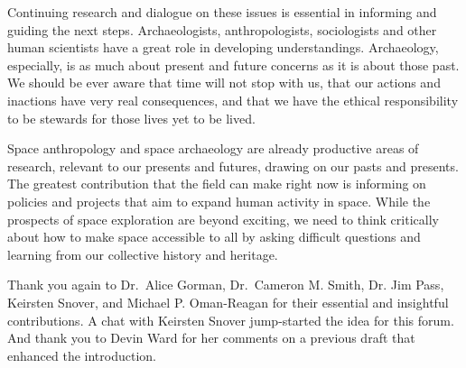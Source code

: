 Continuing research and dialogue on these issues is essential in informing and guiding the next steps. Archaeologists, anthropologists, sociologists and other human scientists have a great role in developing understandings. Archaeology, especially, is as much about present and future concerns as it is about those past. We should be ever aware that time will not stop with us, that our actions and inactions have very real consequences, and that we have the ethical responsibility to be stewards for those lives yet to be lived.

Space anthropology and space archaeology are already productive areas of research, relevant to our presents and futures, drawing on our pasts and presents. The greatest contribution that the field can make right now is informing on policies and projects that aim to expand human activity in space. While the prospects of space exploration are beyond exciting, we need to think critically about how to make space accessible to all by asking difficult questions and learning from our collective history and heritage.


Thank you again to Dr.~Alice Gorman, Dr.~Cameron M. Smith, Dr. Jim Pass, Keirsten Snover, and Michael P. Oman-Reagan for their essential and insightful contributions. A chat with Keirsten Snover jump-started the idea for this forum. And thank you to Devin Ward for her comments on a previous draft that enhanced the introduction.

\IJSRAclosing
